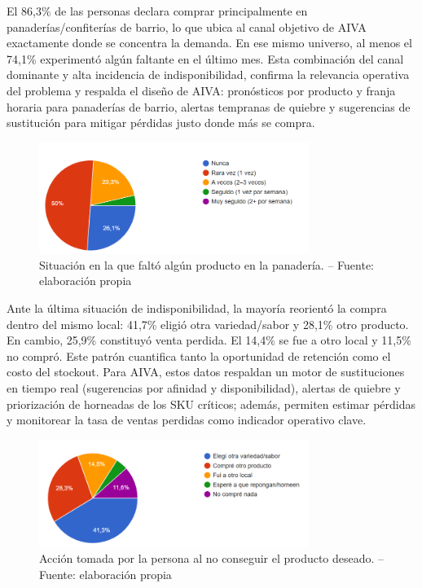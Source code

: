 El 86,3\% de las personas declara comprar principalmente en panaderías/confiterías de barrio, lo que ubica al canal objetivo de AIVA exactamente donde se concentra la demanda. En ese mismo universo, al menos el 74,1\% experimentó algún faltante en el último mes. Esta combinación del canal dominante y alta incidencia de indisponibilidad, confirma la relevancia operativa del problema y respalda el diseño de AIVA: pronósticos por producto y franja horaria para panaderías de barrio, alertas tempranas de quiebre y sugerencias de sustitución para mitigar pérdidas justo donde más se compra.

\begin{figure}[t]
    \centering
    \includegraphics[width=0.78\textwidth]{images/NoHubieraProducto.png}
    \caption{Situación en la que faltó algún producto en la panadería. -- Fuente: elaboración propia}
    \label{fig:no-hubiera-producto}
\end{figure}


Ante la última situación de indisponibilidad, la mayoría reorientó la compra dentro del mismo local: 41,7\% eligió otra variedad/sabor y 28,1\% otro producto. En cambio, 25,9\% constituyó venta perdida. El 14,4\% se fue a otro local y 11,5\% no compró. Este patrón cuantifica tanto la oportunidad de retención como el costo del stockout. Para AIVA, estos datos respaldan un motor de sustituciones en tiempo real (sugerencias por afinidad y disponibilidad), alertas de quiebre y priorización de horneadas de los SKU críticos; además, permiten estimar pérdidas y monitorear la tasa de ventas perdidas como indicador operativo clave.


\begin{figure}[t]
    \centering
    \includegraphics[width=0.78\textwidth]{images/AccionPosterior.png}
    \caption{Acción tomada por la persona al no conseguir el producto deseado. -- Fuente: elaboración propia}
    \label{fig:accion-posterior}
\end{figure}


